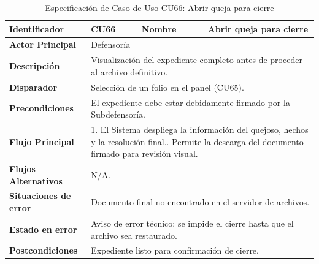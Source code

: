 \vspace{0.8cm}

\begingroup
\setlength{\parskip}{0pt}
\begin{longtable}{|p{3.5cm}|p{2cm}|p{2.5cm}|p{7cm}|}
\caption{Especificación de Caso de Uso CU66: Abrir queja para cierre}
\label{tab:cu66} \\
\hline
\textbf{Identificador} & CU66 & \textbf{Nombre} & Abrir queja para cierre \\ \hline
\textbf{Actor Principal} & \multicolumn{3}{p{11.5cm}|}{Defensoría} \\ \hline
\textbf{Descripción} & \multicolumn{3}{p{11.5cm}|}{Visualización del expediente completo antes de proceder al archivo definitivo.} \\ \hline
\textbf{Disparador} & \multicolumn{3}{p{11.5cm}|}{Selección de un folio en el panel (CU65).} \\ \hline
\textbf{Precondiciones} & \multicolumn{3}{p{11.5cm}|}{El expediente debe estar debidamente firmado por la Subdefensoría.} \\ \hline
\textbf{Flujo Principal} & \multicolumn{3}{p{11.5cm}|}{1. El Sistema despliega la información del quejoso, hechos y la resolución final.\newline 2. Permite la descarga del documento firmado para revisión visual.} \\ \hline
\textbf{Flujos Alternativos} & \multicolumn{3}{p{11.5cm}|}{N/A.} \\ \hline
\textbf{Situaciones de error} & \multicolumn{3}{p{11.5cm}|}{Documento final no encontrado en el servidor de archivos.} \\ \hline
\textbf{Estado en error} & \multicolumn{3}{p{11.5cm}|}{Aviso de error técnico; se impide el cierre hasta que el archivo sea restaurado.} \\ \hline
\textbf{Postcondiciones} & \multicolumn{3}{p{11.5cm}|}{Expediente listo para confirmación de cierre.} \\ \hline
\end{longtable}
\endgroup

\vspace{0.8cm}

